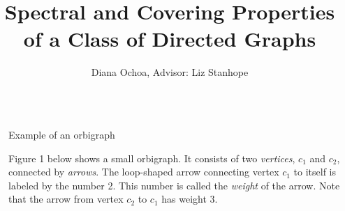 \documentclass[final]{beamer}
\title{Spectral and Covering Properties of a Class of Directed Graphs} %
\author{Diana Ochoa, Advisor: Liz Stanhope} %
\institute{Mathematical Sciences; Lewis \& Clark College} %
\newlength{\sepwid}
\newlength{\onecolwid}
\begin{document}

\setlength{\belowcaptionskip}{2ex} %
\setlength\belowdisplayshortskip{2ex} %

\begin{frame}[t] %

\begin{columns}[t] %

\begin{column}{\sepwid}\end{column} %

\begin{column}{\onecolwid} %


%


\begin{block}{Example of an orbigraph}

Figure 1 below shows a small orbigraph.  It consists of two \emph{vertices}, $c_1$ and $c_2$, connected by \emph{arrows}.  The loop-shaped arrow connecting vertex $c_1$ to itself is labeled by the number 2.  This number is called the \emph{weight} of the arrow.  Note that the arrow from vertex  $c_2$ to $c_1$ has weight 3.
      


\end{block}
\end{column}
\end{columns}
\end{frame}
\end{document}
